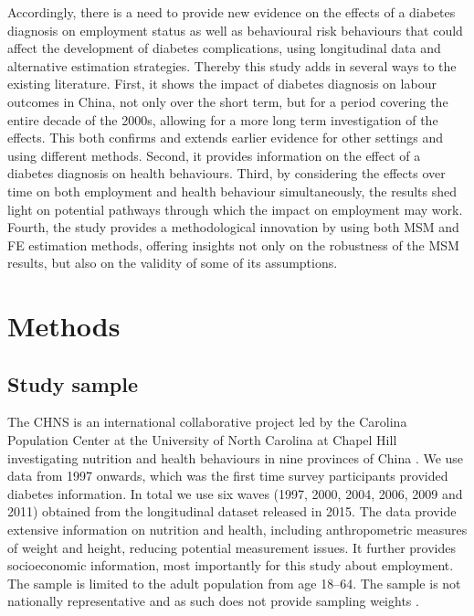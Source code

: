 Accordingly, there is a need to provide new evidence on the effects of a diabetes diagnosis on employment status as well as behavioural risk behaviours that could affect the development of diabetes complications, using longitudinal data and alternative estimation strategies. Thereby this study adds in several ways to the existing literature. First, it shows the impact of diabetes diagnosis on labour outcomes in China, not only over the short term, but for a period covering the entire decade of the 2000s, allowing for a more long term investigation of the effects. This both confirms and extends earlier evidence for other settings and using different methods. Second, it provides information on the effect of a diabetes diagnosis on health behaviours. Third, by considering the effects over time on both employment and health behaviour simultaneously, the results shed light on potential pathways through which the impact on employment may work.  Fourth, the study provides a methodological innovation by using both \ac{MSM} and \ac{FE} estimation methods, offering insights not only on the robustness of the \ac{MSM} results, but also on the validity of some of its assumptions.  


\section{\label{sec:Methods5}Methods}

\subsection{Study sample}


The \ac{CHNS} is an international collaborative project led by the Carolina Population Center at the University of North Carolina at Chapel Hill investigating nutrition and health behaviours in nine provinces of China \parencite{Zhang2014d}. We use data from 1997 onwards, which was the first time survey participants provided diabetes information. In total we use six waves (1997, 2000, 2004, 2006, 2009 and 2011) obtained from the longitudinal dataset released in 2015. The data provide extensive information on nutrition and health, including anthropometric measures of weight and height, reducing potential measurement issues. It further provides socioeconomic information, most importantly for this study about employment. The sample is limited to the adult population from age 18--64.  The sample is not nationally representative and as such does not provide sampling weights  \parencite{Popkin2010}.

